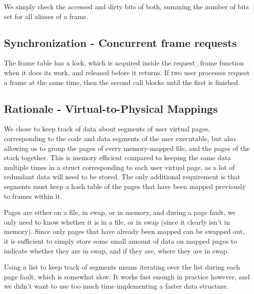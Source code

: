 
We simply check the accessed and dirty bits of both, summing the number of bits
set for all aliases of a frame.

\subsection{Synchronization - Concurrent frame requests}


The frame table has a lock, which is acquired inside the request\_frame
function when it does its work, and released before it returns. If two user
processes request a frame at the same time, then the second call blocks
until the first is finished.

\subsection{Rationale - Virtual-to-Physical Mappings}


We chose to keep track of data about segments of user virtual pages,
corresponding to the code and data segments of the user executable, but also
allowing us to group the pages of every memory-mapped file, and the pages of the
stack together. This is memory efficient compared to keeping the same data
multiple times in a struct corresponding to each user virtual page, as a lot of
redundant data will need to be stored. The only additional requirement is that
segments must keep a hash table of the pages that have been mapped previously to
frames within it.

Pages are either on a file, in swap, or in memory, and during a page fault, we
only need to know whether it is in a file, or in swap (since it clearly isn't in
memory). Since only pages that have already been mapped can be swapped out, it
is sufficient to simply store some small amount of data on mapped pages to
indicate whether they are in swap, and if they are, where they are in swap.

Using a list to keep track of segments means iterating over the list during each
page fault, which is somewhat slow. It works fast enough in practice however,
and we didn't want to use too much time implementing a faster data structure.
